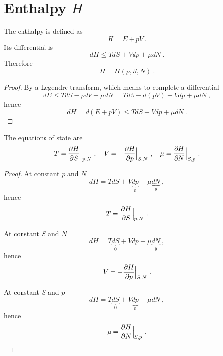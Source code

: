 \section{Enthalpy $H$} 

    The enthalpy is defined as 
    \begin{equation*}
        H = E + pV ~.
    \end{equation*}
    Its differential is 
    \begin{equation*}
        dH \leq TdS + Vdp + \mu dN ~.
    \end{equation*}
    Therefore
    \begin{equation*}
        H = H(p, S, N) ~.
    \end{equation*}
    \begin{proof}
        By a Legendre transform, which means to complete a differential
        \begin{equation*}
            dE \leq T dS - p dV + \mu dN = TdS - d(pV) + V dp + \mu dN ~,
        \end{equation*}
        hence 
        \begin{equation*}
            dH = d(E + pV) \leq TdS + Vdp + \mu dN ~.
        \end{equation*}
    \end{proof}

    The equations of state are
    \begin{equation}
        T = \frac{\partial H}{\partial S} \Big \vert_{p,N} ~, \quad V = - \frac{\partial H}{\partial p} \Big \vert_{S,N} ~, \quad \mu = \frac{\partial H}{\partial N} \Big \vert_{S, p} ~. 
    \end{equation}
    \begin{proof}
        At constant $p$ and $N$
        \begin{equation*}
            dH = TdS + V\underbrace{dp}_0 + \mu \underbrace{dN}_0 ~,
        \end{equation*}
        hence 
        \begin{equation*}
            T = \frac{\partial H}{\partial S} \Big \vert_{p,N} ~.
        \end{equation*}

        At constant $S$ and $N$
        \begin{equation*}
            dH = T\underbrace{dS}_0 + Vdp + \mu \underbrace{dN}_0~,
        \end{equation*}
        hence 
        \begin{equation*}
            V = - \frac{\partial H}{\partial p} \Big \vert_{S,N} ~.
        \end{equation*}

        At constant $S$ and $p$
        \begin{equation*}
            dH = T\underbrace{dS}_0 + V\underbrace{dp}_0 + \mu dN ~,
        \end{equation*}
        hence 
        \begin{equation*}
            \mu = \frac{\partial H}{\partial N} \Big \vert_{S, p} ~.
        \end{equation*}
    \end{proof}

